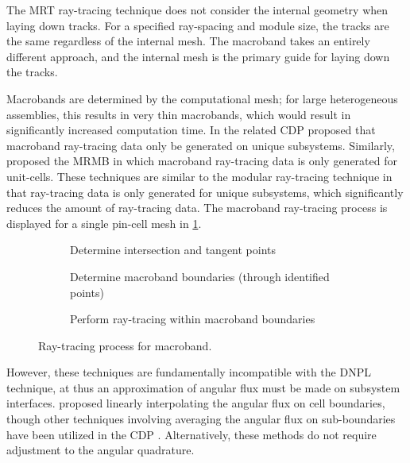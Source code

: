{{{        The \ac{MRT} ray-tracing technique does not consider the internal geometry when laying down tracks.
        For a specified ray-spacing and module size, the tracks are the same regardless of the internal mesh.
        The macroband takes an entirely different approach, and the internal mesh is the primary guide for laying down the tracks.

        Macrobands are determined by the computational mesh; for large heterogeneous assemblies, this results in very thin macrobands, which would result in significantly increased computation time.
        In the related \ac{CDP} \citet{Hong1999} proposed that macroband ray-tracing data only be generated on unique subsystems.
        Similarly, \citet{Yamamoto2005} proposed the \ac{MRMB} in which macroband ray-tracing data is only generated for unit-cells.
        These techniques are similar to the modular ray-tracing technique in that ray-tracing data is only generated for unique subsystems, which significantly reduces the amount of ray-tracing data.
        The macroband ray-tracing process is displayed for a single pin-cell mesh in \cref{fig:RT:Macroband Process}.

        \begin{figure}[!ht]
          \centering
          \begin{subfigure}[t]{0.33\linewidth}
            \centering
            \def\svgwidth{0.95\linewidth}
            
            \caption{Determine intersection and tangent points}
          \end{subfigure}%
          \hfill
          \begin{subfigure}[t]{0.33\linewidth}
            \centering
            \def\svgwidth{0.95\linewidth}
            
            \caption{Determine macroband boundaries (through identified points)}
          \end{subfigure}%
          \hfill
          \begin{subfigure}[t]{0.33\linewidth}
            \centering
            \def\svgwidth{0.95\linewidth}
            
            \caption{Perform ray-tracing within macroband boundaries}
          \end{subfigure}
          \caption{Ray-tracing process for macroband.}
          \label{fig:RT:Macroband Process}
        \end{figure}

        However, these techniques are fundamentally incompatible with the \ac{DNPL} technique, at thus an approximation of angular flux must be made on subsystem interfaces.
        \citet{Yamamoto2005} proposed linearly interpolating the angular flux on cell boundaries, though other techniques involving averaging the angular flux on sub-boundaries have been utilized in the \ac{CDP} \cite{Liu2014}.
        Alternatively, these methods do not require adjustment to the angular quadrature.

}}}
